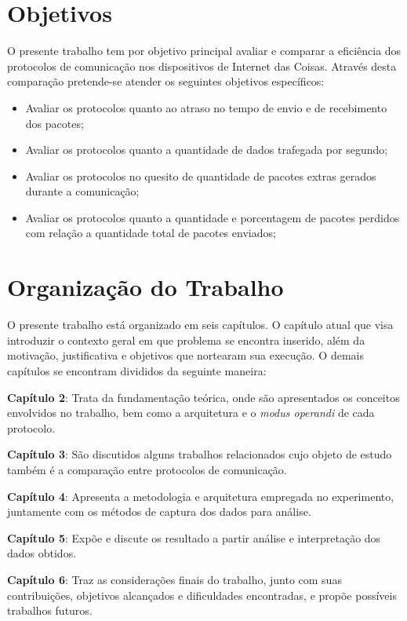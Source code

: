 \section{Objetivos}

O presente trabalho tem por objetivo principal avaliar e comparar a eficiência dos protocolos de comunicação nos dispositivos de Internet das Coisas. Através desta comparação pretende-se atender os seguintes objetivos específicos:

\begin{itemize}
    \item Avaliar os protocolos quanto ao atraso no tempo de envio e de recebimento dos pacotes;
    \item Avaliar os protocolos quanto a quantidade de dados trafegada por segundo;
    \item Avaliar os protocolos no quesito de quantidade de pacotes extras gerados durante a comunicação;
    \item Avaliar os protocolos quanto a quantidade e porcentagem de pacotes perdidos com relação a quantidade total de pacotes enviados;
\end{itemize}


\section{Organização do Trabalho}

O presente trabalho está organizado em seis capítulos. O capítulo atual que visa introduzir o contexto geral em que problema se encontra inserido, além da motivação, justificativa e objetivos que nortearam sua execução. O demais capítulos se encontram divididos da seguinte maneira:

\textbf{Capítulo 2}: Trata da fundamentação teórica, onde são apresentados os conceitos envolvidos no trabalho, bem como a arquitetura e o \textit{modus operandi} de cada protocolo.

\textbf{Capítulo 3}: São discutidos alguns trabalhos relacionados cujo objeto de estudo também é a comparação entre protocolos de comunicação.

\textbf{Capítulo 4}: Apresenta a metodologia e arquitetura empregada no experimento, juntamente com os métodos de captura dos dados para análise.

\textbf{Capítulo 5}: Expõe e discute os resultado a partir análise e interpretação dos dados obtidos.

\textbf{Capítulo 6}: Traz as considerações finais do trabalho, junto com suas contribuições, objetivos alcançados e dificuldades encontradas, e propõe possíveis trabalhos futuros.